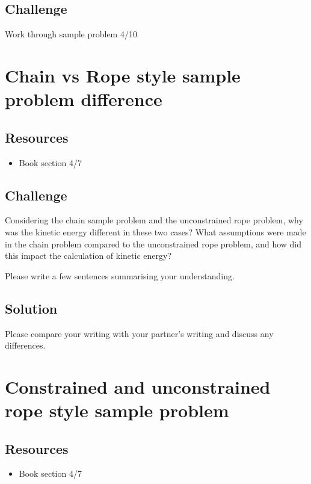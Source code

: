 \subsection*{Challenge}
Work through sample problem 4/10




\newpage
\section{Chain vs Rope style sample problem difference}

\subsection*{Resources}
\begin{itemize}
    \item Book section 4/7
\end{itemize}

\subsection*{Challenge}
Considering the chain sample problem and the unconstrained rope problem, why was the kinetic energy different in these two cases? What assumptions were made in the chain problem compared to the unconstrained rope problem, and how did this impact the calculation of kinetic energy?

Please write a few sentences summarising your understanding.

\subsection*{Solution}
Please compare your writing with your partner's writing and discuss any differences.




\newpage
\section{Constrained and unconstrained rope style sample problem}

\subsection*{Resources}
\begin{itemize}
    \item Book section 4/7
\end{itemize}

